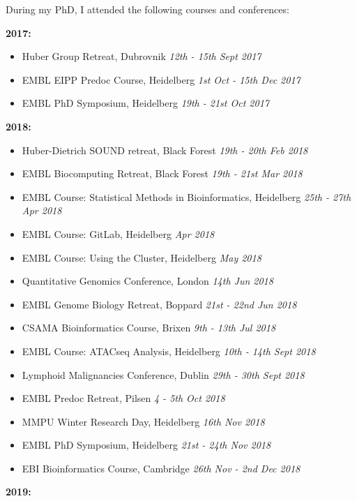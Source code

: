 \documentclass[11pt, a4paper, twosided]{book}
\begin{document}
    During my PhD, I attended the following courses and conferences:

    \textbf{2017:}
    \begin{itemize}
      \item Huber Group Retreat, Dubrovnik \textit{12th - 15th Sept 2017}
      \item EMBL EIPP Predoc Course, Heidelberg \textit{1st Oct - 15th Dec 2017}
      \item EMBL PhD Symposium, Heidelberg \textit{19th - 21st Oct 2017}
    \end{itemize}
    \textbf{2018:}
    \begin{itemize}
      \item Huber-Dietrich SOUND retreat, Black Forest \textit{19th - 20th Feb 2018}
      \item EMBL Biocomputing Retreat, Black Forest \textit{19th - 21st Mar 2018}
      \item EMBL Course: Statistical Methods in Bioinformatics, Heidelberg \textit{25th - 27th Apr 2018}
      \item EMBL Course: GitLab, Heidelberg \textit{Apr 2018}
      \item EMBL Course: Using the Cluster, Heidelberg \textit{May 2018}
      \item Quantitative Genomics Conference, London \textit{14th Jun 2018}
      \item EMBL Genome Biology Retreat, Boppard \textit{21st - 22nd Jun 2018}
      \item CSAMA Bioinformatics Course, Brixen \textit{9th - 13th Jul 2018}
      \item EMBL Course: ATACseq Analysis, Heidelberg \textit{10th - 14th Sept 2018}
      \item Lymphoid Malignancies Conference, Dublin \textit{29th - 30th Sept 2018}
      \item EMBL Predoc Retreat, Pilsen \textit{4 - 5th Oct 2018}
      \item MMPU Winter Research Day, Heidelberg \textit{16th Nov 2018}
      \item EMBL PhD Symposium, Heidelberg \textit{21st - 24th Nov 2018}
      \item EBI Bioinformatics Course, Cambridge \textit{26th Nov - 2nd Dec 2018}
      \end{itemize}
    \textbf{2019:}
\end{document}
